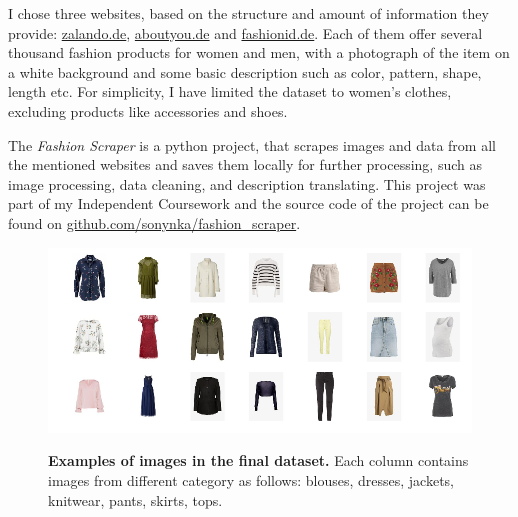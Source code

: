 \documentclass[12pt]{report}
\begin{document}
I chose three websites, based on the structure and amount of information they provide: \href{https://www.zalando.de/damen-home/}{zalando.de}, \href{https://www.aboutyou.de/}{aboutyou.de} and \href{https://www.fashionid.de/damen/}{fashionid.de}. Each of them offer several thousand fashion products for women and men, with a photograph of the item on a white background and some basic description such as color, pattern, shape, length etc. For simplicity, I have limited the dataset to women's clothes, excluding products like accessories and shoes.

The \textit{Fashion Scraper} is a python project, that scrapes images and data from all the mentioned websites and saves them locally for further processing, such as image processing, data cleaning, and description translating. This project was part of my Independent Coursework and the source code of the project can be found on \href{https://github.com/sonynka/fashion_scraper}{github.com/sonynka/fashion\_scraper}.

\begin{figure}[h]
\centering
{\includegraphics[width=\linewidth]{03_analysis/data/img_grid2}}
\caption{\label{fig:dataset} \textbf{Examples of images in the final dataset.} Each column contains images from different category as follows: blouses, dresses, jackets, knitwear, pants, skirts, tops.}
\end{figure}
\end{document}
